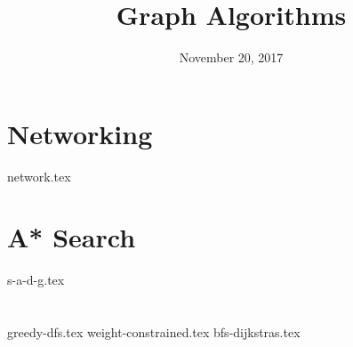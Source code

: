 \documentclass[11pt]{exam}
\title{Graph Algorithms}
\date{November 20, 2017}
\begin{document}
\maketitle

\section{Networking}
\begin{questions}
{network.tex}
\end{questions}

\section{A* Search}
\begin{questions}
{s-a-d-g.tex}
\end{questions}

\section{}
\begin{questions}
{greedy-dfs.tex}
{weight-constrained.tex}
{bfs-dijkstras.tex}
\end{questions}
\end{document}
